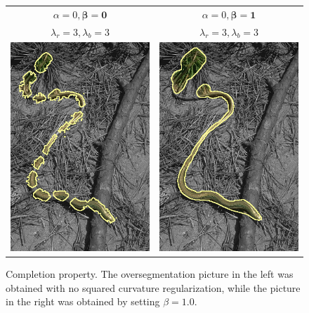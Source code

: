 \begin{figure}
\center
\begin{tabular}{cc}
$\alpha=0, \mathbf{\beta=0}$ & $\alpha=0, \mathbf{\beta=1}$\\
$\lambda_r = 3, \lambda_b = 3$ & $\lambda_r = 3, \lambda_b = 3$\\
 	\includegraphics[scale=0.25]{figures/chapter8/completion/graphseg/alpha-0.0/beta-0.0/gamma-3.0/radius-7/corrected-seg.png} & 
 	\includegraphics[scale=0.25]{figures/chapter8/completion/graphseg/alpha-0.0/beta-1.0/gamma-3.0/radius-7/corrected-seg.png}
\end{tabular}	
\caption{Completion property. The oversegmentation picture in the left was obtained with no squared curvature regularization, while the picture in the right was obtained by setting $\beta=1.0$. }
\label{ch8:fig:segmentation-curvature-completion}
\end{figure}

